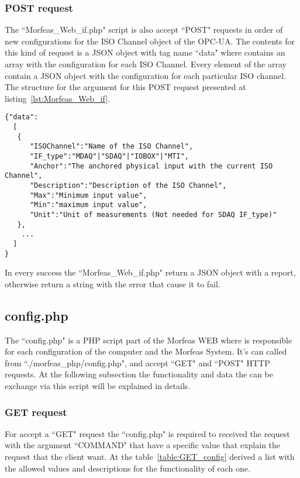 \subsubsection{POST request}
The ``Morfeas\_Web\_if.php" script is also accept ``POST" requests in order of new configurations for the ISO Channel object of the OPC-UA.
The contents for this kind of request is a JSON object with tag name ``data" where contains an array with the configuration for each ISO Channel.
Every element of the array contain a JSON object with the configuration for each particular ISO channel. The structure for the argument for this POST request
presented at listing~\ref{lst:Morfeas_Web_if}.

\begin{lstlisting}[frame=single,caption=Example for argument of POST request for Morfeas\_Web\_if.php,label=lst:Morfeas_Web_if]
{"data":
  [
   {
      "ISOChannel":"Name of the ISO Channel",
      "IF_type":"MDAQ"|"SDAQ"|"IOBOX"|"MTI",
      "Anchor":"The anchored physical input with the current ISO Channel",
      "Description":"Description of the ISO Channel",
      "Max":"Minimum input value",
      "Min":"maximum input value",
      "Unit":"Unit of measurements (Not needed for SDAQ IF_type)"
   },
    ...
  ]
}
\end{lstlisting}

In every success the ``Morfeas\_Web\_if.php" return a JSON object with a report, otherwise return a string with the error that cause it to fail.

\newpage
\subsection{config.php}
The ``config.php" is a PHP script part of the Morfeas WEB where is responsible for each configuration of the computer and the Morfeas System. It's can called from ``./morfeas\_php/config.php",
and accept ``GET" and ``POST" HTTP requests. At the following subsection the functionality and data the can be exchange via this script will be explained in details.

\subsubsection{GET request}
For accept a ``GET" request the ``config.php" is required to received the request with the argument ``COMMAND" that have a specific value that explain the request that the client want.
At the table~\ref{table:GET_config} derived a list with the allowed values and descriptions for the functionality of each one.

